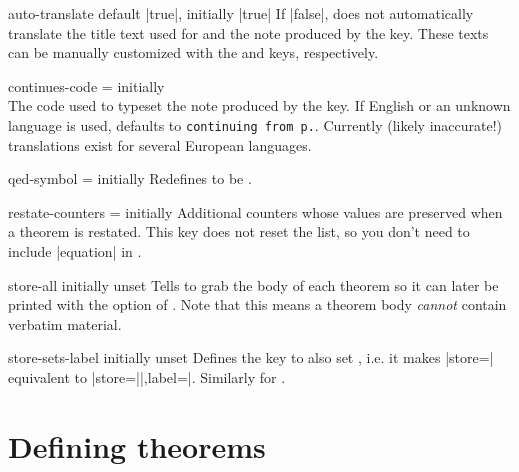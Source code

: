 \documentclass{ltxdoc}
\newcommand{\ttbraces}[1]{\braces{\texttt{#1}}}
\begin{document}
\begin{docKey}{auto-translate}
  {}
  {default |true|, initially |true|}
If |false|,  does not automatically translate the title text used for  and the note produced by the  key.
These texts can be manually customized with the  and  keys, respectively.
\end{docKey}

\begin{docKey}{continues-code}
  {=}
  {initially\\ \ttbraces{keythms\string_continues}\ttbraces{\#1}}
The code used to typeset the note produced by the  key.
If English or an unknown language is used, defaults to \texttt{continuing from p.}\cs{,}\ttbraces{\#1}.
Currently (likely inaccurate!) translations exist for several European languages.
\end{docKey}

\begin{docKey}{qed-symbol}
  {=}
  {initially }
Redefines  to be .
\end{docKey}

\begin{docKey}{restate-counters}
  {=}
  {initially \ttbraces{equation}}
Additional counters whose values are preserved when a theorem is restated.
This key does not reset the list, so you don't need to include |equation| in .
\end{docKey}

\begin{docKey}{store-all}
  {}
  {initially unset}
Tells  to grab the body of each theorem so it can later be printed with the  option of .
Note that this means a theorem body \emph{cannot} contain verbatim material.
\end{docKey}

\begin{docKey}{store-sets-label}
  {}
  {initially unset}
Defines the  key to also set , i.e. it makes |store=| equivalent to |store=||,label=|. Similarly for .
\end{docKey}

\section{Defining theorems}
\end{document}
